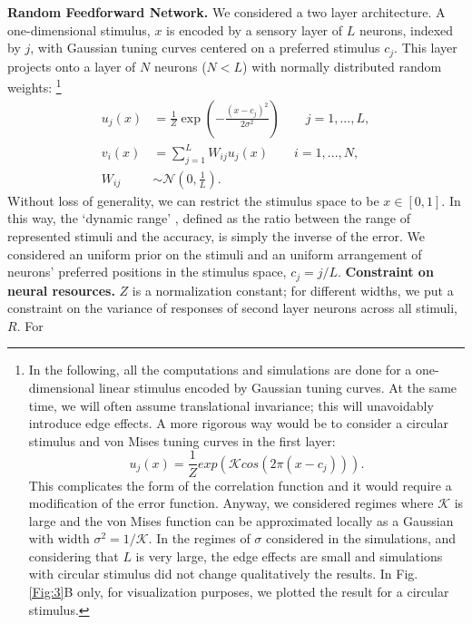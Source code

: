 \documentclass[a4paper]{article}%
\begin{document}
\textbf{Random Feedforward Network.} We considered a two layer architecture. A
one-dimensional stimulus, $x$ is encoded by a sensory layer of $L$ neurons,
indexed by $j$, with Gaussian tuning curves centered on a preferred stimulus
$c_{j}$. This layer projects onto a layer of $N$ neurons ($N<L$) with normally
distributed random weights: \footnote{In the following, all the computations and simulations
are done for a one-dimensional linear stimulus encoded by Gaussian tuning
curves. At the same time, we will often assume translational invariance; this
will unavoidably introduce edge effects. A more rigorous way would be to
consider a circular stimulus and von Mises tuning curves in the first layer:
\[
u_{j}(x) = \frac{1}{Z} exp\left(\mathcal{K} cos\left(2\pi\left(x-c_{j}\right)\right)\right).
\]
This complicates the form of the correlation function and it would require a
modification of the error function. Anyway, we considered regimes where
$\mathcal{K}$ is large and the von Mises function can be approximated locally
as a Gaussian with width $\sigma^{2} = 1/\mathcal{K}$. In the regimes
of $\sigma$ considered in the simulations, and considering that $L$ is very
large, the edge effects are small and simulations with circular stimulus did
not change qualitatively the results. In Fig. \ref{Fig:3}B only, for visualization purposes, we plotted the result for a circular stimulus.}
\begin{equation}
\begin{split}
u_{j}(x)  & = \frac{1}{Z} \exp\left(-\frac{\left(x-c_{j}\right)^{2}}{2 \sigma^{2}
}\right) \qquad j = 1,...,L,\\
v_{i}(x)  & =\sum_{j=1}^{L} W_{ij} u_{j}(x) \qquad i =1,...,N,\\
W_{ij}  &  \sim\mathcal{N}(0,\frac{1}{L}).
\end{split}
\label{Eq:RFFN}
\end{equation}
Without loss of generality, we can restrict the stimulus space to be
$x\in[0,1]$. In this way, the `dynamic range' , defined as the ratio between
the range of represented stimuli and the accuracy, is simply the inverse of the error. We
considered an uniform prior on the stimuli and an uniform arrangement of neurons' preferred positions in the
stimulus space, $c_{j} = j/L$. 
\newline
\newline
\textbf{Constraint on neural resources.}
$Z$ is a normalization constant; for different widths, we put a constraint
on the variance of responses of second layer neurons across all stimuli, $R$. For
\end{document}
